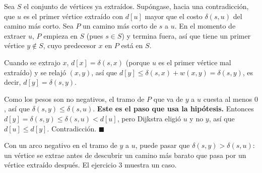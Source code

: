 \ejercicio{}

Sea $S$ el conjunto de vértices ya extraídos. Supóngase, hacia una contradicción, que $u$ es el primer vértice extraído con $d[u]$ mayor que el costo $\delta(s, u)$ del camino más corto. Sea $P$ un camino más corto de $s$ a $u$. En el momento de extraer $u$, $P$ empieza en $S$ (pues $s \in S$) y termina fuera, así que tiene un primer vértice $y \notin S$, cuyo predecesor $x$ en $P$ está en $S$.

Cuando se extrajo $x$, $d[x] = \delta(s, x)$ (porque $u$ es el primer vértice mal extraído) y se relajó $(x, y)$, así que $d[y] \le \delta(s, x) + w(x, y) = \delta(s, y)$, es decir, $d[y] = \delta(s, y)$.

Como los pesos son no negativos, el tramo de $P$ que va de $y$ a $u$ cuesta al menos $0$, así que $\delta(s, y) \le \delta(s, u)$. \textbf{Este es el paso que usa la hipótesis.} Entonces $d[y] = \delta(s, y) \le \delta(s, u) < d[u]$, pero Dijkstra eligió $u$ y no $y$, así que $d[u] \le d[y]$. Contradicción. \hfill$\blacksquare$

Con un arco negativo en el tramo de $y$ a $u$, puede pasar que $\delta(s, y) > \delta(s, u)$: un vértice se extrae antes de descubrir un camino más barato que pasa por un vértice extraído después. El ejercicio 3 muestra un caso.
